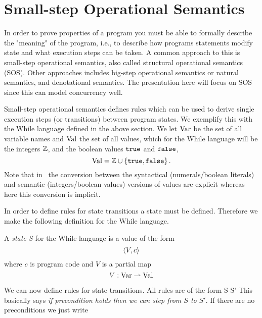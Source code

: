 \section{Small-step Operational Semantics} \label{sec:language_semantics}

In order to prove properties of a program you must be able to formally describe
the "meaning" of the program, i.e., to describe how programs statements modify
state and what execution steps can be taken. A common approach to this is
small-step operational semantics, also called structural operational semantics
(SOS). Other approaches includes big-step operational semantics or natural
semantics, and denotational semantics. The presentation here will focus on SOS
since this can model concurrency well. 

Small-step operational semantics defines rules which can be used to derive
single execution steps (or transitions) between program states. We exemplify
this with the While language defined in the above section. 
We let $\mbox{$\mathrm{Var}$}$ be the set of all variable names and $\mbox{$\mathrm{Val}$}$ the
set of all values, which for the While language will be the integers $\mathbb{Z}$,
and the boolean values $\mbox{\texttt{true}}$ and $\mbox{\texttt{false}}$,
\begin{equation*}
  \mbox{$\mathrm{Val}$} = \mathbb{Z} \cup \left\{ \mbox{\texttt{true}}, \mbox{\texttt{false}} \right\}.
\end{equation*}
Note that in~\parencite{nielson2007semantics} 
the conversion between the syntactical (numerals\slash boolean literals) and semantic
(integers\slash boolean values) versions of values are explicit whereas here 
this conversion is implicit.

In order to define rules for state transitions a state must be defined.
Therefore we make the following definition for the While language.

\begin{definition}
  A \emph{state} $S$ for the While language is a value of the form
  \begin{equation*}
    \langle V, c \rangle  
  \end{equation*}
  where $c$ is program code and $V$ is a partial map
  \begin{equation*}
    V: \mbox{$\mathrm{Var}$} \rightharpoonup \mbox{$\mathrm{Val}$}
  \end{equation*}
\end{definition}

We can now define rules for state transitions.
All rules are of the form
{S \rightarrow S'}
This basically says {\it if precondition holds then we can step from $S$
to $S'$}. If there are no preconditions we just write

